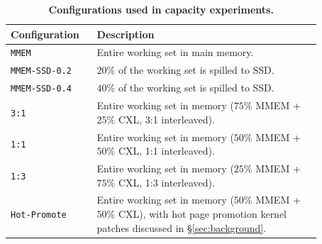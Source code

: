 \begin{table}[!t]
  \centering
  \small
  \begin{tabular}{|p{0.22\linewidth} | p{0.65\linewidth}|} 
        \hline
        Configuration & Description \\\hline
        \texttt{MMEM} & Entire working set in main memory. \\\hline
        \texttt{MMEM-SSD-0.2} & $20\%$ of the working set is spilled to SSD. \\\hline
        \texttt{MMEM-SSD-0.4} & $40\%$ of the working set is spilled to SSD. \\\hline
        \texttt{3:1} & Entire working set in memory ($75\%$ MMEM + $25\%$ CXL, 3:1 interleaved). \\\hline
        \texttt{1:1} & Entire working set in memory ($50\%$ MMEM + $50\%$ CXL, 1:1 interleaved). \\\hline
        \texttt{1:3} & Entire working set in memory ($25\%$ MMEM + $75\%$ CXL, 1:3 interleaved). \\\hline
        \texttt{Hot-Promote} & Entire working set in memory ($50\%$ MMEM + $50\%$ CXL), with hot page promotion kernel patches discussed in \S\ref{sec:background}. \\\hline
  \end{tabular}
  \caption{\textbf{Configurations used in capacity experiments.} }
  \label{tab:swconfig}
  \vspace{-1.5em}
\end{table}


